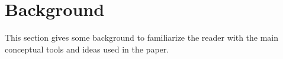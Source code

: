 \section{Background}
\label{sec:background}

This section gives some background to familiarize the reader with the main conceptual tools and
ideas used in the paper.
